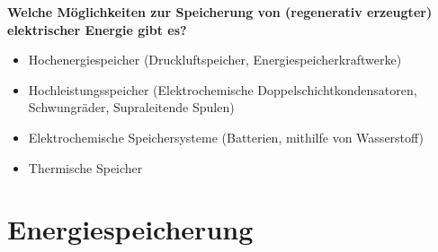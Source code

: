 \textbf{Welche Möglichkeiten zur Speicherung von (regenerativ erzeugter) elektrischer Energie
gibt es?\\}
\begin{itemize}
\item Hochenergiespeicher (Druckluftspeicher, Energiespeicherkraftwerke)
\end{itemize}
\begin{itemize}
\item Hochleistungsspeicher (Elektrochemische Doppelschichtkondensatoren, Schwungräder, Supraleitende Spulen)
\end{itemize} 
\begin{itemize}
\item Elektrochemische Speichersysteme (Batterien, mithilfe von Wasserstoff)
\end{itemize}
\begin{itemize}
\item Thermische Speicher
\end{itemize}

\section{Energiespeicherung}
